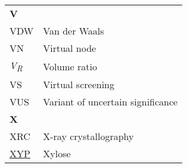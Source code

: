 \begin{longtable}[l]{@{}p{2.5cm}p{12cm}@{}}
\textbf{\large V} & \\[0.25cm]
\textmd{VDW} & Van der Waals \\
\textmd{VN} & Virtual node \\
\textmd{\textit{V\textsubscript{R}}} & Volume ratio \\
\textmd{VS} & Virtual screening \\
\textmd{VUS} & Variant of uncertain significance \\[0.3175cm]
\textbf{\large X} & \\[0.25cm]
\textmd{XRC} & X-ray crystallography \\
\textmd{\href{https://www.ebi.ac.uk/pdbe-srv/pdbechem/chemicalCompound/show/XYP}{XYP}} & Xylose \\[0.3175cm]

\end{longtable}
